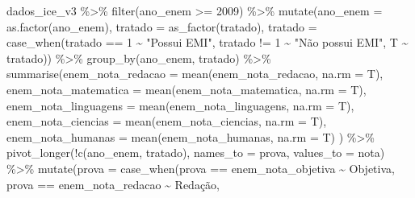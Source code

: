\documentclass[
  letterpaper,
  DIV=11,
  numbers=noendperiod]{scrartcl}
\newenvironment{Shaded}{\begin{snugshade}}{\end{snugshade}}
\newcommand{\AttributeTok}[1]{\textcolor[rgb]{0.40,0.45,0.13}{#1}}
\newcommand{\DecValTok}[1]{\textcolor[rgb]{0.68,0.00,0.00}{#1}}
\newcommand{\FunctionTok}[1]{\textcolor[rgb]{0.28,0.35,0.67}{#1}}
\newcommand{\NormalTok}[1]{\textcolor[rgb]{0.00,0.23,0.31}{#1}}
\newcommand{\SpecialCharTok}[1]{\textcolor[rgb]{0.37,0.37,0.37}{#1}}
\newcommand{\StringTok}[1]{\textcolor[rgb]{0.13,0.47,0.30}{#1}}
\begin{document}
\begin{Shaded}
\begin{Highlighting}[]
\NormalTok{dados\_ice\_v3 }\SpecialCharTok{\%\textgreater{}\%} 
  \FunctionTok{filter}\NormalTok{(ano\_enem }\SpecialCharTok{\textgreater{}=} \DecValTok{2009}\NormalTok{) }\SpecialCharTok{\%\textgreater{}\%} 
    \FunctionTok{mutate}\NormalTok{(}\AttributeTok{ano\_enem =} \FunctionTok{as.factor}\NormalTok{(ano\_enem),}
           \AttributeTok{tratado =} \FunctionTok{as\_factor}\NormalTok{(tratado),}
           \AttributeTok{tratado =} \FunctionTok{case\_when}\NormalTok{(tratado }\SpecialCharTok{==} \DecValTok{1} \SpecialCharTok{\textasciitilde{}} \StringTok{"Possui EMI"}\NormalTok{,}
\NormalTok{                               tratado }\SpecialCharTok{!=} \DecValTok{1} \SpecialCharTok{\textasciitilde{}} \StringTok{"Não possui EMI"}\NormalTok{,}
\NormalTok{                               T }\SpecialCharTok{\textasciitilde{}}\NormalTok{ tratado)) }\SpecialCharTok{\%\textgreater{}\%}
    \FunctionTok{group\_by}\NormalTok{(ano\_enem, tratado) }\SpecialCharTok{\%\textgreater{}\%} 
    \FunctionTok{summarise}\NormalTok{(}\AttributeTok{enem\_nota\_redacao =} \FunctionTok{mean}\NormalTok{(enem\_nota\_redacao, }\AttributeTok{na.rm =}\NormalTok{ T),}
              \AttributeTok{enem\_nota\_matematica =} \FunctionTok{mean}\NormalTok{(enem\_nota\_matematica, }\AttributeTok{na.rm =}\NormalTok{ T),}
              \AttributeTok{enem\_nota\_linguagens =} \FunctionTok{mean}\NormalTok{(enem\_nota\_linguagens, }\AttributeTok{na.rm =}\NormalTok{ T),}
              \AttributeTok{enem\_nota\_ciencias =} \FunctionTok{mean}\NormalTok{(enem\_nota\_ciencias, }\AttributeTok{na.rm =}\NormalTok{ T),}
              \AttributeTok{enem\_nota\_humanas =} \FunctionTok{mean}\NormalTok{(enem\_nota\_humanas, }\AttributeTok{na.rm =}\NormalTok{ T)}
\NormalTok{              ) }\SpecialCharTok{\%\textgreater{}\%}
  \FunctionTok{pivot\_longer}\NormalTok{(}\SpecialCharTok{!}\FunctionTok{c}\NormalTok{(ano\_enem, tratado), }
               \AttributeTok{names\_to =} \StringTok{\textquotesingle{}prova\textquotesingle{}}\NormalTok{,}
               \AttributeTok{values\_to =} \StringTok{\textquotesingle{}nota\textquotesingle{}}\NormalTok{) }\SpecialCharTok{\%\textgreater{}\%} 
  \FunctionTok{mutate}\NormalTok{(}\AttributeTok{prova =} \FunctionTok{case\_when}\NormalTok{(prova }\SpecialCharTok{==} \StringTok{\textquotesingle{}enem\_nota\_objetiva\textquotesingle{}} \SpecialCharTok{\textasciitilde{}} \StringTok{\textquotesingle{}Objetiva\textquotesingle{}}\NormalTok{,}
\NormalTok{                           prova }\SpecialCharTok{==} \StringTok{\textquotesingle{}enem\_nota\_redacao\textquotesingle{}} \SpecialCharTok{\textasciitilde{}} \StringTok{\textquotesingle{}Redação\textquotesingle{}}\NormalTok{,}

\end{Highlighting}
\end{Shaded}
\end{document}
